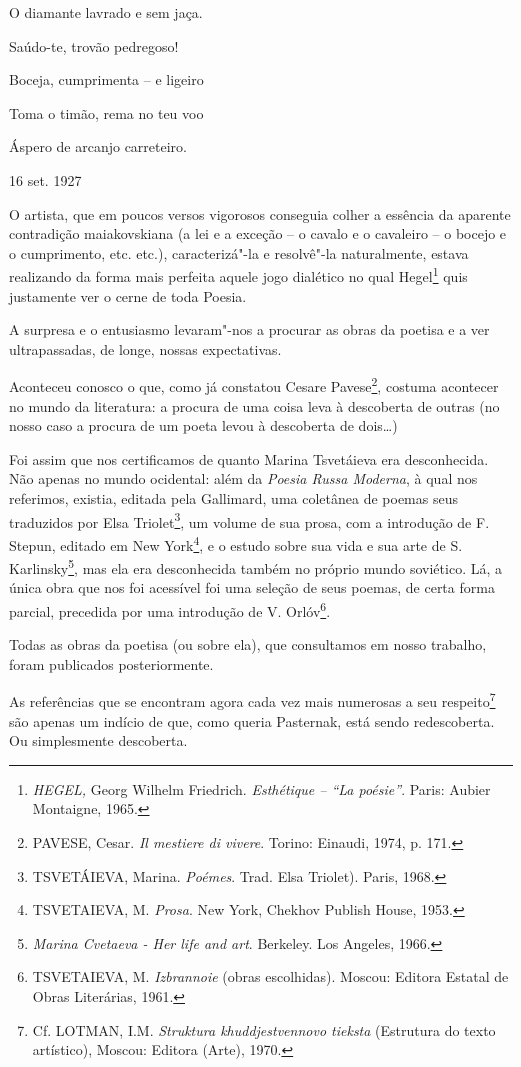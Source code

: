 O diamante lavrado e sem jaça.

Saúdo-te, trovão pedregoso!

Boceja, cumprimenta -- e ligeiro

Toma o timão, rema no teu voo

Áspero de arcanjo carreteiro.

16 set. 1927

O artista, que em poucos versos vigorosos conseguia colher a essência da
aparente contradição maiakovskiana (a lei e a exceção -- o cavalo e o
cavaleiro -- o bocejo e o cumprimento, etc. etc.), caracterizá"-la e
resolvê"-la naturalmente, estava realizando da forma mais perfeita aquele
jogo dialético no qual Hegel\footnote{\emph{HEGEL,} Georg Wilhelm
  Friedrich. \emph{Esthétique -- ``La poésie''}. Paris: Aubier
  Montaigne, 1965.} quis justamente ver o cerne de toda Poesia.

A surpresa e o entusiasmo levaram"-nos a procurar as obras da poetisa e a
ver ultrapassadas, de longe, nossas expectativas.

Aconteceu conosco o que, como já constatou Cesare Pavese\footnote{PAVESE,
  Cesar. \emph{Il mestiere di vivere}. Torino: Einaudi, 1974, p. 171.},
costuma acontecer no mundo da literatura: a procura de uma coisa leva à
descoberta de outras (no nosso caso a procura de um poeta levou à
descoberta de dois\ldots{})

Foi assim que nos certificamos de quanto Marina Tsvetáieva era
desconhecida. Não apenas no mundo ocidental: além da \emph{Poesia Russa
Moderna}, à qual nos referimos, existia, editada pela Gallimard, uma
coletânea de poemas seus traduzidos por Elsa Triolet\footnote{TSVETÁIEVA,
  Marina. \emph{Poémes}. Trad. Elsa Triolet). Paris, 1968.}, um volume
de sua prosa, com a introdução de F. Stepun, editado em New
York\footnote{TSVETAIEVA, M. \emph{Prosa}. New York, Chekhov Publish
  House, 1953.}, e o estudo sobre sua vida e sua arte de S.
Karlinsky\footnote{\emph{Marina Cvetaeva - Her life and art}. Berkeley.
  Los Angeles, 1966.}, mas ela era desconhecida também no próprio mundo
soviético. Lá, a única obra que nos foi acessível foi uma seleção de
seus poemas, de certa forma parcial, precedida por uma introdução de V.
Orlóv\footnote{TSVETAIEVA, M. \emph{Izbrannoie} (obras escolhidas).
  Moscou: Editora Estatal de Obras Literárias, 1961.}.

Todas as obras da poetisa (ou sobre ela), que consultamos em nosso
trabalho, foram publicados posteriormente.

As referências que se encontram agora cada vez mais numerosas a seu
respeito\footnote{Cf. LOTMAN, I.M. \emph{Struktura khuddjestvennovo
  tieksta} (Estrutura do texto artístico), Moscou: Editora (Arte), 1970.}
são apenas um indício de que, como queria Pasternak, está sendo
redescoberta. Ou simplesmente descoberta.

